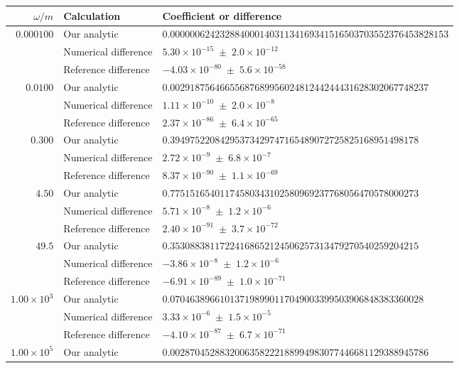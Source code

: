 \begin{table}[!htbp]
\centering
\comptonprecisiontable
\begin{tabular}{rll}
\toprule
$\omega/m$ & Calculation & Coefficient or difference\\
\midrule
$0.000100$ & Our analytic & $0.00000062423288400014031134169341516503703552376453828153$ \\
 & Numerical difference & $5.30\times10^{-15}\;\pm\;2.0\times10^{-12}$ \\
 & Reference difference & $-4.03\times10^{-80}\;\pm\;5.6\times10^{-58}$ \\
\addlinespace[3pt]
$0.0100$ & Our analytic & $0.0029187564665568768995602481244244431628302067748237$ \\
 & Numerical difference & $1.11\times10^{-10}\;\pm\;2.0\times10^{-8}$ \\
 & Reference difference & $2.37\times10^{-86}\;\pm\;6.4\times10^{-65}$ \\
\addlinespace[3pt]
$0.300$ & Our analytic & $0.39497522084295373429747165489072725825168951498178$ \\
 & Numerical difference & $2.72\times10^{-9}\;\pm\;6.8\times10^{-7}$ \\
 & Reference difference & $8.37\times10^{-90}\;\pm\;1.1\times10^{-69}$ \\
\addlinespace[3pt]
$4.50$ & Our analytic & $0.77515165401174580343102580969237768056470578000273$ \\
 & Numerical difference & $5.71\times10^{-8}\;\pm\;1.2\times10^{-6}$ \\
 & Reference difference & $2.40\times10^{-91}\;\pm\;3.7\times10^{-72}$ \\
\addlinespace[3pt]
$49.5$ & Our analytic & $0.35308838117224168652124506257313479270540259204215$ \\
 & Numerical difference & $-3.86\times10^{-8}\;\pm\;1.2\times10^{-6}$ \\
 & Reference difference & $-6.91\times10^{-89}\;\pm\;1.0\times10^{-71}$ \\
\addlinespace[3pt]
$1.00\times10^{3}$ & Our analytic & $0.070463896610137198990117049003399503906848383360028$ \\
 & Numerical difference & $3.33\times10^{-6}\;\pm\;1.5\times10^{-5}$ \\
 & Reference difference & $-4.10\times10^{-87}\;\pm\;6.7\times10^{-71}$ \\
\addlinespace[3pt]
$1.00\times10^{5}$ & Our analytic & $0.0028704528832006358222188994983077446681129388945786$ \\

\end{tabular}
\end{table}
